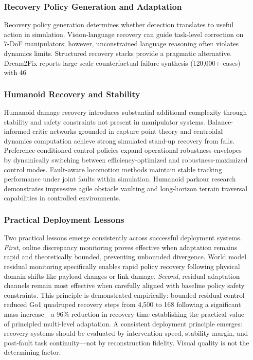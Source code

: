 ﻿\documentclass[11pt,a4paper]{article}
\begin{document}
\subsubsection{Recovery Policy Generation and Adaptation}
Recovery policy generation determines whether detection translates to useful action in simulation. Vision-language recovery can guide task-level correction on 7-DoF manipulators; however, unconstrained language reasoning often violates dynamics limits. Structured recovery stacks provide a pragmatic alternative. Dream2Fix \cite{li2025dream2fix} reports large-scale counterfactual failure synthesis (120,000+ cases) with 46%

\subsubsection{Humanoid Recovery and Stability}

Humanoid damage recovery introduces substantial additional complexity through stability and safety constraints not present in manipulator systems. Balance-informed critic networks grounded in capture point theory and centroidal dynamics computation achieve strong simulated stand-up recovery from falls. Preference-conditioned control policies expand operational robustness envelopes by dynamically switching between efficiency-optimized and robustness-maximized control modes. Fault-aware locomotion methods maintain stable tracking performance under joint faults within simulation. Humanoid parkour research demonstrates impressive agile obstacle vaulting and long-horizon terrain traversal capabilities in controlled environments.

\subsubsection{Practical Deployment Lessons}

Two practical lessons emerge consistently across successful deployment systems. \emph{First}, online discrepancy monitoring proves effective when adaptation remains rapid and theoretically bounded, preventing unbounded divergence. World model residual monitoring specifically enables rapid policy recovery following physical domain shifts like payload changes or link damage. \emph{Second}, residual adaptation channels remain most effective when carefully aligned with baseline policy safety constraints. This principle is demonstrated empirically: bounded residual control reduced Go1 quadruped recovery steps from 4,500 to 168 following a significant mass increase—a 96\% reduction in recovery time establishing the practical value of principled multi-level adaptation. A consistent deployment principle emerges: recovery systems should be evaluated by intervention speed, stability margin, and post-fault task continuity—not by reconstruction fidelity. Visual quality is not the determining factor.
\end{document}
